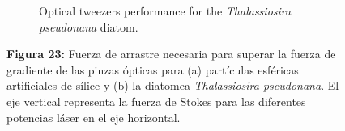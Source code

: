 \documentclass[10pt,aspectratio=1610,compress,dvipsnames]{beamer}
\begin{document}
\begin{frame}
{\begin{figure}[H]
\begin{subfigure}[b]{0.49\textwidth}
         \caption{Optical tweezers performance for the \textit{Thalassiosira pseudonana} diatom.}
         \label{figx}
     \end{subfigure}
      \captionsetup{labelformat = empty}
     \caption{\textbf{Figura 23:} Fuerza de arrastre necesaria para superar la fuerza de gradiente de las pinzas ópticas para (a) partículas esféricas artificiales de sílice y (b) la diatomea \textit{Thalassiosira pseudonana}. El eje vertical representa la fuerza de Stokes para las diferentes potencias láser en el eje horizontal.}
     \hfill
    \label{forces_microfluidcs} 
\end{figure}



}


\end{frame}
\end{document}
